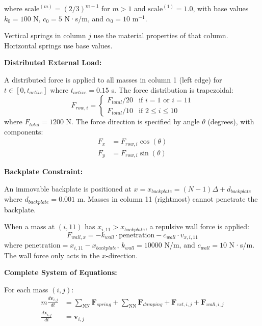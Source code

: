 \documentclass[11pt,a4paper]{article}
\begin{document}
\noindent where $\text{scale}^{(m)} = (2/3)^{m-1}$ for $m > 1$ and $\text{scale}^{(1)} = 1.0$, with base values $k_0 = 100$ N, $c_0 = 5$ N·s/m, and $\alpha_0 = 10$ m$^{-1}$. \newline

\noindent Vertical springs in column $j$ use the material properties of that column. Horizontal springs use base values. \newline

\noindent \textbf{Distributed External Load:}

\noindent A distributed force is applied to all masses in column 1 (left edge) for $t \in [0, t_{active}]$ where $t_{active} = 0.15$ s. The force distribution is trapezoidal:
\begin{equation}
F_{row,i} = \begin{cases}
F_{total}/20 & \text{if } i = 1 \text{ or } i = 11 \\
F_{total}/10 & \text{if } 2 \leq i \leq 10
\end{cases}
\end{equation}
where $F_{total} = 1200$ N. The force direction is specified by angle $\theta$ (degrees), with components:
\begin{align}
F_x &= F_{row,i} \cos(\theta) \\
F_y &= F_{row,i} \sin(\theta)
\end{align}

\noindent \textbf{Backplate Constraint:}

\noindent An immovable backplate is positioned at $x = x_{backplate} = (N-1)\Delta + d_{backplate}$ where $d_{backplate} = 0.001$ m. Masses in column 11 (rightmost) cannot penetrate the backplate. \newline

\noindent When a mass at $(i, 11)$ has $x_{i,11} > x_{backplate}$, a repulsive wall force is applied:
\begin{equation}
F_{wall,x} = -k_{wall} \cdot \text{penetration} - c_{wall} \cdot v_{x,i,11}
\label{eq:wall_force}
\end{equation}
where $\text{penetration} = x_{i,11} - x_{backplate}$, $k_{wall} = 10000$ N/m, and $c_{wall} = 10$ N·s/m. The wall force only acts in the $x$-direction. \newline

\noindent \textbf{Complete System of Equations:}

\noindent For each mass $(i, j)$:
\begin{align}
m \frac{d\mathbf{v}_{i,j}}{dt} &= \sum_{\text{NN}} \mathbf{F}_{spring} + \sum_{\text{NN}} \mathbf{F}_{damping} + \mathbf{F}_{ext,i,j} + \mathbf{F}_{wall,i,j} \\
\frac{d\mathbf{x}_{i,j}}{dt} &= \mathbf{v}_{i,j}
\end{align}
\end{document}
